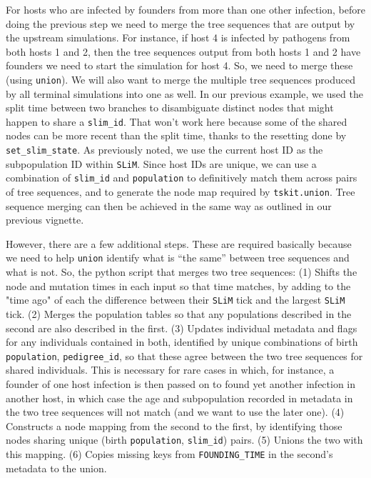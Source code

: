 \documentclass[12pt]{article}
\newcommand{\slim}[0]{\texttt{SLiM}\xspace}
\begin{document}
For hosts who are infected by founders from more than one other infection,
before doing the previous step we need to merge the tree sequences that are output by
the upstream simulations.
For instance, if host 4 is infected by pathogens from both hosts 1 and 2,
then the tree sequences output from both hosts 1 and 2
have founders we need to start the simulation for host 4.
So, we need to merge these (using \verb|union|).
We will also want to merge the multiple tree sequences produced by all
terminal simulations into one as well.
In our previous example, we used the split time between two branches
to disambiguate distinct nodes that might happen to share a \verb|slim_id|.
That won't work here because some of the shared nodes can be more recent than the split time,
thanks to the resetting done by \verb|set_slim_state|.
As previously noted, we use the current host ID as the subpopulation ID within \slim.
Since host IDs are unique,
we can use a combination of \verb|slim_id| and \verb|population| to
definitively match them across pairs of tree sequences,
and to generate the node map required by \verb|tskit.union|.
Tree sequence merging can then be achieved in the same way as outlined
in our previous vignette. %

However, there are a few additional steps.
These are required basically because we need to help \verb|union|
identify what is ``the same'' between tree sequences and what is not.
So, the python script that merges two tree sequences:
(1) Shifts the node and mutation times in each input so that time matches,
by adding to the "time ago" of each the difference between their \slim tick and the largest \slim tick.
(2) Merges the population tables so that any populations described in the second
are also described in the first.
(3) Updates individual metadata and flags for any individuals contained in both,
identified by unique combinations of birth \verb|population|, \verb|pedigree_id|,
so that these agree between the two tree sequences for shared individuals.
This is necessary for rare cases in which, for instance, a founder of one host infection
is then passed on to found yet another infection in another host,
in which case the age and subpopulation recorded in metadata in the two tree sequences
will not match (and we want to use the later one).
(4) Constructs a node mapping from the second to the first, by identifying those
nodes sharing unique (birth \verb|population|, \verb|slim_id|) pairs.
(5) Unions the two with this mapping.
(6) Copies missing keys from \verb|FOUNDING_TIME| in the second's metadata to the union.
\end{document}
